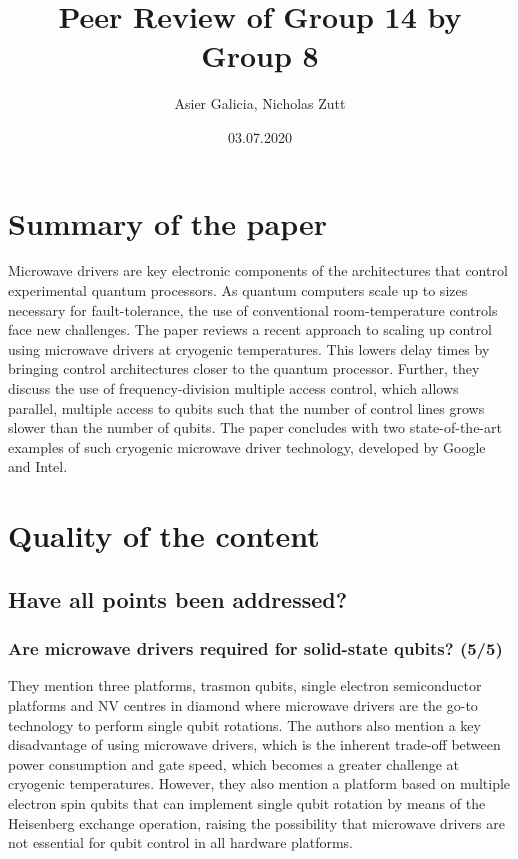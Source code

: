 \documentclass[11pt]{article}
\author{Asier Galicia, Nicholas Zutt}
\date{03.07.2020}
\title{Peer Review of Group 14 by Group 8}
\begin{document}
\maketitle

\section{Summary of the paper}
\label{sec:org1920089}

Microwave drivers are key electronic components of the architectures
that control experimental quantum processors. As quantum computers
scale up to sizes necessary for fault-tolerance, the use of
conventional room-temperature controls face new challenges. The paper
reviews a recent approach to scaling up control using microwave
drivers at cryogenic temperatures. This lowers delay times by bringing
control architectures closer to the quantum processor. Further, they
discuss the use of frequency-division multiple access control, which
allows parallel, multiple access to qubits such that the number of
control lines grows slower than the number of qubits. The paper
concludes with two state-of-the-art examples of such cryogenic
microwave driver technology, developed by Google and Intel.

\section{Quality of the content}
\label{sec:org0be0e18}

\subsection{Have all points been addressed?}
\label{sec:org8901d4b}

\subsubsection{Are microwave drivers required for solid-state qubits? (5/5)}
\label{sec:org7b3309a}
They mention three platforms, trasmon qubits, single electron
semiconductor platforms and NV centres in diamond where microwave
drivers are the go-to technology to perform single qubit
rotations. The authors also mention a key disadvantage of using
microwave drivers, which is the inherent trade-off between power
consumption and gate speed, which becomes a greater challenge at
cryogenic temperatures. However, they also mention a platform
based on multiple electron spin qubits that can implement single
qubit rotation by means of the Heisenberg exchange operation,
raising the possibility that microwave drivers are not essential
for qubit control in all hardware platforms.
\end{document}
